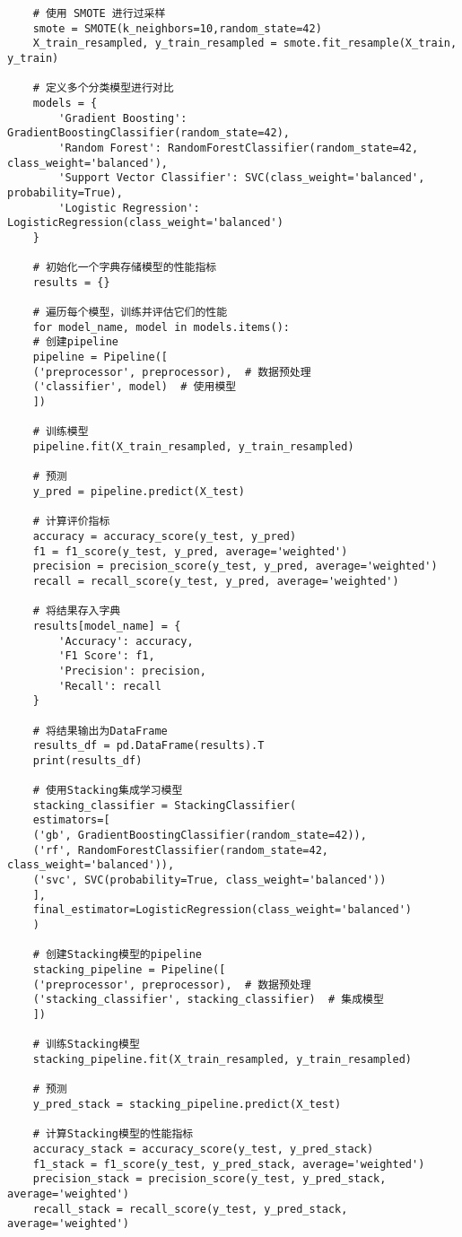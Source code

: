 \documentclass[bwprint,fontset=windows]{gmcmthesis}
\begin{document}
\begin{lstlisting}
	# 使用 SMOTE 进行过采样
	smote = SMOTE(k_neighbors=10,random_state=42)
	X_train_resampled, y_train_resampled = smote.fit_resample(X_train, y_train)
	
	# 定义多个分类模型进行对比
	models = {
		'Gradient Boosting': GradientBoostingClassifier(random_state=42),
		'Random Forest': RandomForestClassifier(random_state=42, class_weight='balanced'),
		'Support Vector Classifier': SVC(class_weight='balanced', probability=True),
		'Logistic Regression': LogisticRegression(class_weight='balanced')
	}
	
	# 初始化一个字典存储模型的性能指标
	results = {}
	
	# 遍历每个模型，训练并评估它们的性能
	for model_name, model in models.items():
	# 创建pipeline
	pipeline = Pipeline([
	('preprocessor', preprocessor),  # 数据预处理
	('classifier', model)  # 使用模型
	])
	
	# 训练模型
	pipeline.fit(X_train_resampled, y_train_resampled)
	
	# 预测
	y_pred = pipeline.predict(X_test)
	
	# 计算评价指标
	accuracy = accuracy_score(y_test, y_pred)
	f1 = f1_score(y_test, y_pred, average='weighted')
	precision = precision_score(y_test, y_pred, average='weighted')
	recall = recall_score(y_test, y_pred, average='weighted')
	
	# 将结果存入字典
	results[model_name] = {
		'Accuracy': accuracy,
		'F1 Score': f1,
		'Precision': precision,
		'Recall': recall
	}
	
	# 将结果输出为DataFrame
	results_df = pd.DataFrame(results).T
	print(results_df)
	
	# 使用Stacking集成学习模型
	stacking_classifier = StackingClassifier(
	estimators=[
	('gb', GradientBoostingClassifier(random_state=42)),
	('rf', RandomForestClassifier(random_state=42, class_weight='balanced')),
	('svc', SVC(probability=True, class_weight='balanced'))
	],
	final_estimator=LogisticRegression(class_weight='balanced')
	)
	
	# 创建Stacking模型的pipeline
	stacking_pipeline = Pipeline([
	('preprocessor', preprocessor),  # 数据预处理
	('stacking_classifier', stacking_classifier)  # 集成模型
	])
	
	# 训练Stacking模型
	stacking_pipeline.fit(X_train_resampled, y_train_resampled)
	
	# 预测
	y_pred_stack = stacking_pipeline.predict(X_test)
	
	# 计算Stacking模型的性能指标
	accuracy_stack = accuracy_score(y_test, y_pred_stack)
	f1_stack = f1_score(y_test, y_pred_stack, average='weighted')
	precision_stack = precision_score(y_test, y_pred_stack, average='weighted')
	recall_stack = recall_score(y_test, y_pred_stack, average='weighted')
	

\end{lstlisting}
\end{document}
